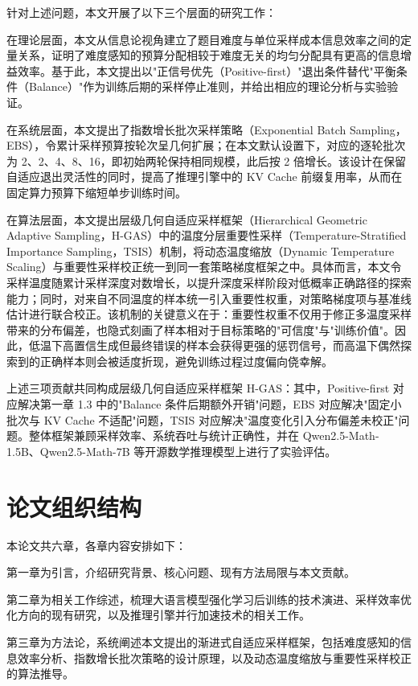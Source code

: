 针对上述问题，本文开展了以下三个层面的研究工作：

在理论层面，本文从信息论视角建立了题目难度与单位采样成本信息效率之间的定量关系，证明了难度感知的预算分配相较于难度无关的均匀分配具有更高的信息增益效率。基于此，本文提出以"正信号优先（Positive-first）"退出条件替代"平衡条件（Balance）"作为训练后期的采样停止准则，并给出相应的理论分析与实验验证。

在系统层面，本文提出了指数增长批次采样策略（Exponential Batch Sampling，EBS），令累计采样预算按轮次呈几何扩展；在本文默认设置下，对应的逐轮批次为 2、2、4、8、16，即初始两轮保持相同规模，此后按 2 倍增长。该设计在保留自适应退出灵活性的同时，提高了推理引擎中的 KV Cache 前缀复用率，从而在固定算力预算下缩短单步训练时间。

在算法层面，本文提出层级几何自适应采样框架（Hierarchical Geometric Adaptive Sampling，H-GAS）中的温度分层重要性采样（Temperature-Stratified Importance Sampling，TSIS）机制，将动态温度缩放（Dynamic Temperature Scaling）与重要性采样校正统一到同一套策略梯度框架之中。具体而言，本文令采样温度随累计采样深度对数增长，以提升深度采样阶段对低概率正确路径的探索能力；同时，对来自不同温度的样本统一引入重要性权重，对策略梯度项与基准线估计进行联合校正。该机制的关键意义在于：重要性权重不仅用于修正多温度采样带来的分布偏差，也隐式刻画了样本相对于目标策略的"可信度"与"训练价值"。因此，低温下高置信生成但最终错误的样本会获得更强的惩罚信号，而高温下偶然探索到的正确样本则会被适度折现，避免训练过程过度偏向侥幸解。

上述三项贡献共同构成层级几何自适应采样框架 H-GAS：其中，Positive-first 对应解决第一章 1.3 中的"Balance 条件后期额外开销"问题，EBS 对应解决"固定小批次与 KV Cache 不适配"问题，TSIS 对应解决"温度变化引入分布偏差未校正"问题。整体框架兼顾采样效率、系统吞吐与统计正确性，并在 Qwen2.5-Math-1.5B、Qwen2.5-Math-7B 等开源数学推理模型上进行了实验评估。


\section{论文组织结构}

本论文共六章，各章内容安排如下：

第一章为引言，介绍研究背景、核心问题、现有方法局限与本文贡献。

第二章为相关工作综述，梳理大语言模型强化学习后训练的技术演进、采样效率优化方向的现有研究，以及推理引擎并行加速技术的相关工作。

第三章为方法论，系统阐述本文提出的渐进式自适应采样框架，包括难度感知的信息效率分析、指数增长批次策略的设计原理，以及动态温度缩放与重要性采样校正的算法推导。

